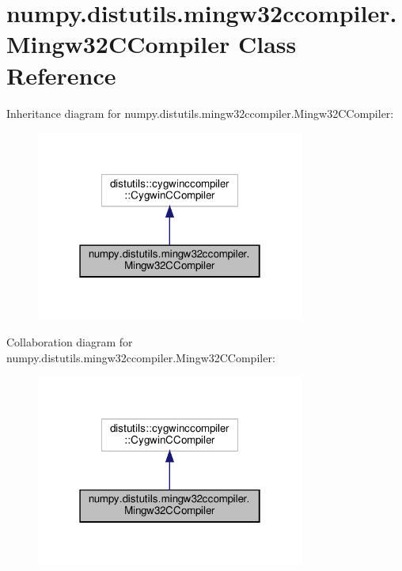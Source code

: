 \hypertarget{classnumpy_1_1distutils_1_1mingw32ccompiler_1_1Mingw32CCompiler}{}\section{numpy.\+distutils.\+mingw32ccompiler.\+Mingw32\+C\+Compiler Class Reference}
\label{classnumpy_1_1distutils_1_1mingw32ccompiler_1_1Mingw32CCompiler}


Inheritance diagram for numpy.\+distutils.\+mingw32ccompiler.\+Mingw32\+C\+Compiler\+:
\nopagebreak
\begin{figure}[H]
\begin{center}
\leavevmode
\includegraphics[width=250pt]{classnumpy_1_1distutils_1_1mingw32ccompiler_1_1Mingw32CCompiler__inherit__graph}
\end{center}
\end{figure}


Collaboration diagram for numpy.\+distutils.\+mingw32ccompiler.\+Mingw32\+C\+Compiler\+:
\nopagebreak
\begin{figure}[H]
\begin{center}
\leavevmode
\includegraphics[width=250pt]{classnumpy_1_1distutils_1_1mingw32ccompiler_1_1Mingw32CCompiler__coll__graph}
\end{center}
\end{figure}
